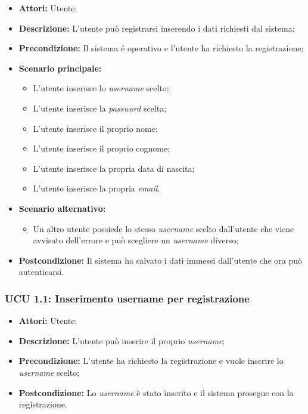 \begin{itemize}
	\item \textbf{Attori:} Utente;
	\item \textbf{Descrizione:} L'utente può registrarsi inserendo i dati richiesti dal sistema;
	\item \textbf{Precondizione:} Il sistema é operativo e l'utente ha richiesto la registrazione;
	\item \textbf{Scenario principale:}
	\begin{itemize}
		\item L'utente inserisce lo \textit{username} scelto;
		\item L'utente inserisce la \textit{password} scelta;
		\item L'utente inserisce il proprio nome;
		\item L'utente inserisce il proprio cognome;
		\item L'utente inserisce la propria data di nascita;
		\item L'utente inserisce la propria \textit{email}.
	\end{itemize}
	\item \textbf{Scenario alternativo:}
	\begin{itemize}
		\item Un altro utente possiede lo stesso \textit{username} scelto dall'utente che viene avvisato dell'errore e può scegliere un \textit{username} diverso;
	\end{itemize}
	\item \textbf{Postcondizione:} Il sistema ha salvato i dati immessi dall'utente che ora può autenticarsi.
\end{itemize}

\hypertarget{U1.1}{}
\subsubsection{UCU 1.1: Inserimento username per registrazione}
\begin{itemize}
	\item \textbf{Attori:} Utente;
	\item \textbf{Descrizione:} L'utente può inserire il proprio \textit{username};
	\item \textbf{Precondizione:} L'utente ha richiesto la registrazione e vuole inserire lo \textit{username} scelto;
	\item \textbf{Postcondizione:} Lo \textit{username} è stato inserito e il sistema prosegue con la registrazione.
\end{itemize}

